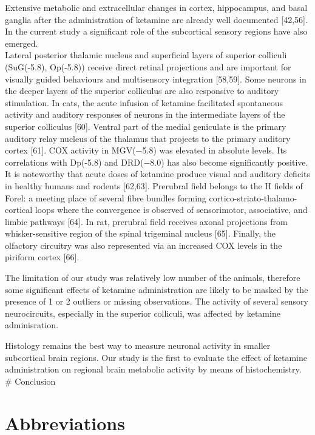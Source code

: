 \documentclass[man]{apa6}
\begin{document}
Extensive metabolic and extracellular changes in cortex, hippocampus, and basal ganglia after the administration of ketamine are already well documented {[}42,56{]}. In the current study a significant role of the subcortical sensory regions have also emerged.\\
Lateral posterior thalamic nucleus and superficial layers of superior colliculi (SuG(-5.8), Op(-5.8)) receive direct retinal projections and are important for visually guided behaviours and multisensory integration {[}58,59{]}. Some neurons in the deeper layers of the superior colliculus are also responsive to auditory stimulation. In cats, the acute infusion of ketamine facilitated spontaneous activity and auditory responses of neurons in the intermediate layers of the superior colliculus {[}60{]}. Ventral part of the medial geniculate is the primary auditory relay nucleus of the thalamus that projects to the primary auditory cortex {[}61{]}. COX activity in MGV(−5.8) was elevated in absolute levels. Its correlations with Dp(-5.8) and DRD(−8.0) has also become significantly positive. It is noteworthy that acute doses of ketamine produce visual and auditory deficits in healthy humans and rodents {[}62,63{]}. Prerubral field belongs to the H fields of Forel: a meeting place of several fibre bundles forming cortico-striato-thalamo-cortical loops where the convergence is observed of sensorimotor, associative, and limbic pathways {[}64{]}. In rat, prerubral field receives axonal projections from whisker-sensitive region of the spinal trigeminal nucleus {[}65{]}. Finally, the olfactory circuitry was also represented via an increased COX levels in the piriform cortex {[}66{]}.

The limitation of our study was relatively low number of the animals, therefore some significant effects of ketamine administration are likely to be masked by the presence of 1 or 2 outliers or missing observations. The activity of several sensory neurocircuits, especially in the superior colliculi, was affected by ketamine adminisration.

Histology remains the best way to measure neuronal activity in smaller subcortical brain regions. Our study is the first to evaluate the effect of ketamine administration on regional brain metabolic activity by means of histochemistry.
\# Conclusion

\hypertarget{abbreviations}{%
\section{Abbreviations}\label{abbreviations}}
\end{document}
